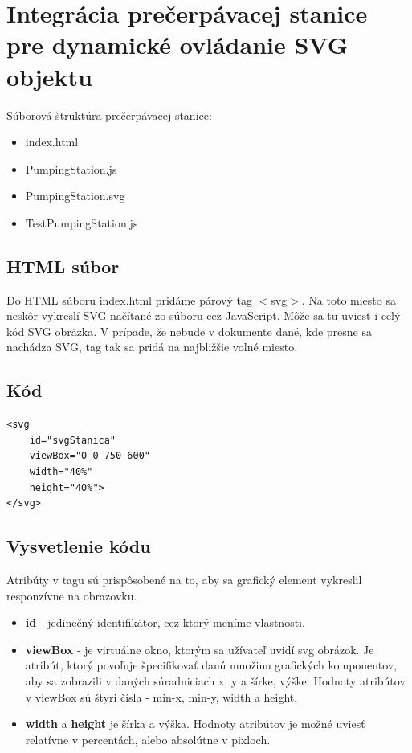 \section{Integrácia prečerpávacej stanice pre dynamické ovládanie SVG objektu}

Súborová štruktúra prečerpávacej stanice: 
\begin{itemize}
	\item index.html 
	\item PumpingStation.js
	\item PumpingStation.svg
	\item TestPumpingStation.js
\end{itemize}

\subsection{HTML súbor}
Do HTML súboru index.html pridáme párový tag $<$svg$>$.  Na toto miesto sa neskôr vykreslí SVG načítané zo súboru cez JavaScript. Môže sa tu uviesť i celý kód SVG obrázka. V prípade, že nebude v dokumente dané, kde presne sa nachádza SVG, tag tak sa pridá na najbližšie voľné miesto. 
\subsection{Kód}
\begin{lstlisting}
<svg 
	id="svgStanica" 
	viewBox="0 0 750 600" 
	width="40%" 
	height="40%"> 
</svg>
\end{lstlisting}

\subsection{Vysvetlenie kódu}
Atribúty v tagu sú prispôsobené na to, aby sa grafický element vykreslil responzívne na obrazovku.
\begin{itemize}
\item  \textbf{id} - jedinečný identifikátor, cez ktorý meníme vlastnosti.
\item 	\textbf{viewBox} - je virtuálne okno, ktorým sa užívateľ uvidí svg obrázok. Je atribút, ktorý povoľuje špecifikovať danú množinu grafických komponentov, aby sa zobrazili v daných súradniciach x, y a šírke, výške. Hodnoty atribútov v viewBox sú štyri čísla - min-x, min-y, width a height. 
\item 	\textbf{width} a \textbf{height} je šírka a výška. Hodnoty atribútov je možné uviesť relatívne v percentách, alebo absolútne v pixloch. 
\end{itemize}

